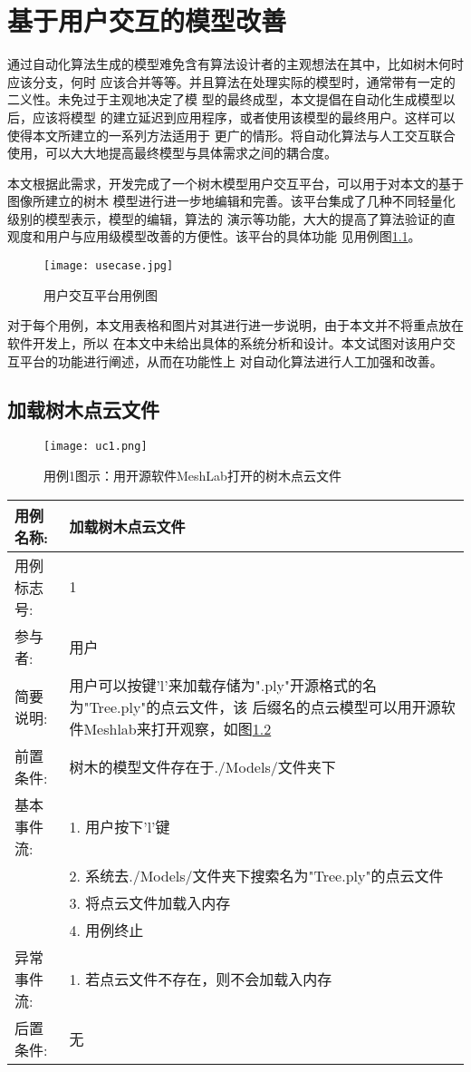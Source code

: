 \chapter{基于用户交互的模型改善}
通过自动化算法生成的模型难免含有算法设计者的主观想法在其中，比如树木何时应该分支，何时
应该合并等等。并且算法在处理实际的模型时，通常带有一定的二义性。未免过于主观地决定了模
型的最终成型，本文提倡在自动化生成模型以后，应该将模型
的建立延迟到应用程序，或者使用该模型的最终用户。这样可以使得本文所建立的一系列方法适用于
更广的情形。将自动化算法与人工交互联合使用，可以大大地提高最终模型与具体需求之间的耦合度。

本文根据此需求，开发完成了一个树木模型用户交互平台，可以用于对本文的基于图像所建立的树木
模型进行进一步地编辑和完善。该平台集成了几种不同轻量化级别的模型表示，模型的编辑，算法的
演示等功能，大大的提高了算法验证的直观度和用户与应用级模型改善的方便性。该平台的具体功能
见用例图\ref{fig:usecase}。

\begin{figure}[H]
	\centering
	\texttt{[image: usecase.jpg]}
	\caption{用户交互平台用例图}
	\label{fig:usecase}
\end{figure}

对于每个用例，本文用表格和图片对其进行进一步说明，由于本文并不将重点放在软件开发上，所以
在本文中未给出具体的系统分析和设计。本文试图对该用户交互平台的功能进行阐述，从而在功能性上
对自动化算法进行人工加强和改善。

\clearpage
\section{加载树木点云文件}

\begin{figure}[H]
	\centering
	\texttt{[image: uc1.png]}
	\caption{用例1图示：用开源软件MeshLab打开的树木点云文件}
	\label{fig:uc1}
\end{figure}

\begin{table}[H]
	\centering
\begin{tabular}{|l|p{8cm}|}
	\hline
	用例名称: & 加载树木点云文件\\
	\hline
	用例标志号: & 1\\
	\hline
	参与者: & 用户\\
	\hline
	简要说明: & 用户可以按键'l'来加载存储为".ply"开源格式的名为"Tree.ply"的点云文件，该
	后缀名的点云模型可以用开源软件Meshlab来打开观察，如图\ref{fig:uc1}\\
	\hline
	前置条件: & 树木的模型文件存在于./Models/文件夹下\\
	\hline
	基本事件流: & 1. 用户按下'l'键\\
	 & 2. 系统去./Models/文件夹下搜索名为"Tree.ply"的点云文件\\
	 & 3. 将点云文件加载入内存\\
	 & 4. 用例终止\\
	\hline
	异常事件流: & 1. 若点云文件不存在，则不会加载入内存\\
	\hline
	后置条件: & 无\\
	\hline
\end{tabular}
\end{table}

